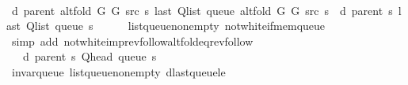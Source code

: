 \begin{isabellebody}
\ \ \isamarkupfalse%
\ {\isachardoublequoteopen}d\ {\isacharparenleft}{\kern0pt}parent\ {\isacharparenleft}{\kern0pt}alt{\isacharunderscore}{\kern0pt}fold\ G{}\ G{}\ src\ s{\isacharparenright}{\kern0pt}{\isacharparenright}{\kern0pt}\ {\isacharparenleft}{\kern0pt}last\ {\isacharparenleft}{\kern0pt}Q{\isacharunderscore}{\kern0pt}list\ {\isacharparenleft}{\kern0pt}queue\ {\isacharparenleft}{\kern0pt}alt{\isacharunderscore}{\kern0pt}fold\ G{}\ G{}\ src\ s{\isacharparenright}{\kern0pt}{\isacharparenright}{\kern0pt}{\isacharparenright}{\kern0pt}{\isacharparenright}{\kern0pt}\ {\isacharequal}{\kern0pt}\ d\ {\isacharparenleft}{\kern0pt}parent\ s{\isacharparenright}{\kern0pt}\ {\isacharparenleft}{\kern0pt}last\ {\isacharparenleft}{\kern0pt}Q{\isacharunderscore}{\kern0pt}list\ {\isacharparenleft}{\kern0pt}queue\ s{\isacharparenright}{\kern0pt}{\isacharparenright}{\kern0pt}{\isacharparenright}{\kern0pt}{\isachardoublequoteclose}\isanewline
\ \ \ \ \isamarkupfalse%
\ list{\isacharunderscore}{\kern0pt}queue{\isacharunderscore}{\kern0pt}non{\isacharunderscore}{\kern0pt}empty\ not{\isacharunderscore}{\kern0pt}white{\isacharunderscore}{\kern0pt}if{\isacharunderscore}{\kern0pt}mem{\isacharunderscore}{\kern0pt}queue\isanewline
\ \ \ \ \isamarkupfalse%
\ {\isacharparenleft}{\kern0pt}simp\ add{\isacharcolon}{\kern0pt}\ not{\isacharunderscore}{\kern0pt}white{\isacharunderscore}{\kern0pt}imp{\isacharunderscore}{\kern0pt}rev{\isacharunderscore}{\kern0pt}follow{\isacharunderscore}{\kern0pt}alt{\isacharunderscore}{\kern0pt}fold{\isacharunderscore}{\kern0pt}eq{\isacharunderscore}{\kern0pt}rev{\isacharunderscore}{\kern0pt}follow{\isacharparenright}{\kern0pt}\isanewline
\ \ \isamarkupfalse%
\ \isamarkupfalse%
\ {\isachardoublequoteopen}{\isachardot}{\kern0pt}{\isachardot}{\kern0pt}{\isachardot}{\kern0pt}\ {\isasymle}\ d\ {\isacharparenleft}{\kern0pt}parent\ s{\isacharparenright}{\kern0pt}\ {\isacharparenleft}{\kern0pt}Q{\isacharunderscore}{\kern0pt}head\ {\isacharparenleft}{\kern0pt}queue\ s{\isacharparenright}{\kern0pt}{\isacharparenright}{\kern0pt}\ {\isacharplus}{\kern0pt}\ {}{\isachardoublequoteclose}\isanewline
\ \ \ \ \isamarkupfalse%
\ invar{\isacharunderscore}{\kern0pt}queue\ list{\isacharunderscore}{\kern0pt}queue{\isacharunderscore}{\kern0pt}non{\isacharunderscore}{\kern0pt}empty\ d{\isacharunderscore}{\kern0pt}last{\isacharunderscore}{\kern0pt}queue{\isacharunderscore}{\kern0pt}le\isanewline
\ \ \ \ \isamarkupfalse%

\end{isabellebody}
